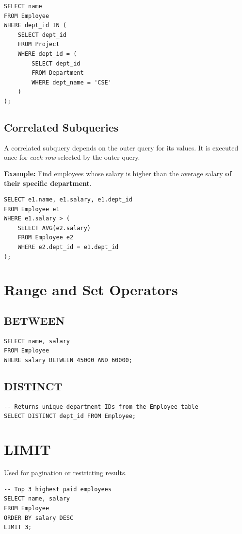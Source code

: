 \documentclass[12pt,a4paper]{article}
\begin{document}
\begin{lstlisting}
SELECT name
FROM Employee
WHERE dept_id IN (
    SELECT dept_id
    FROM Project
    WHERE dept_id = (
        SELECT dept_id
        FROM Department
        WHERE dept_name = 'CSE'
    )
);
\end{lstlisting}

\subsection{Correlated Subqueries}
A correlated subquery depends on the outer query for its values. It is executed once for \textit{each row} selected by the outer query.

\textbf{Example:} Find employees whose salary is higher than the average salary \textbf{of their specific department}.

\begin{lstlisting}
SELECT e1.name, e1.salary, e1.dept_id
FROM Employee e1
WHERE e1.salary > (
    SELECT AVG(e2.salary)
    FROM Employee e2
    WHERE e2.dept_id = e1.dept_id
);
\end{lstlisting}

\section{Range and Set Operators}

\subsection{BETWEEN}
\begin{lstlisting}
SELECT name, salary 
FROM Employee 
WHERE salary BETWEEN 45000 AND 60000;
\end{lstlisting}

\subsection{DISTINCT}
\begin{lstlisting}
-- Returns unique department IDs from the Employee table
SELECT DISTINCT dept_id FROM Employee;
\end{lstlisting}

\section{LIMIT}
Used for pagination or restricting results.

\begin{lstlisting}
-- Top 3 highest paid employees
SELECT name, salary
FROM Employee
ORDER BY salary DESC
LIMIT 3;
\end{lstlisting}
\end{document}
